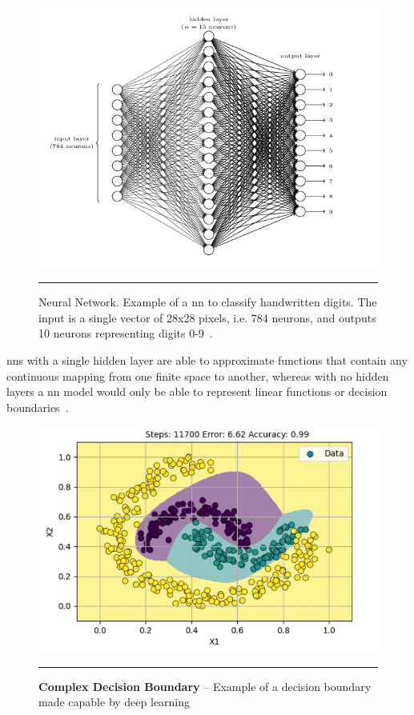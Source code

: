 \begin{figure}[H]
\includegraphics[width=1\textwidth]{media/literature/handwrittenDigitNN.png}
    \rule{35em}{0.5pt}
\caption[Example of a Neural Network]{Neural Network. Example of a \Gls{nn} to
classify handwritten digits. The input is a single vector of 28x28 pixels, i.e. 784 neurons, and outputs
10 neurons representing digits 0-9~\citep{Nielsen2015}.}\label{fig:nn}
\end{figure}

\glspl{nn} with a single hidden layer are able to approximate functions that contain any 
continuous mapping from one finite space to another, whereas with no hidden layers a \gls{nn}
model would only be able to represent linear functions or decision boundaries~\citep{hornik1991}.

\begin{figure}[H]
\includegraphics[width=1\textwidth]{media/literature/deep-boundary.png}
    \rule{35em}{0.5pt}
    \caption[Complex decision boundary from deep neural network]{\textbf{Complex Decision Boundary} -- Example of a decision boundary made capable by deep learning~\citep{sapkota2020}}\label{fig:dnn-decision}
\end{figure}

